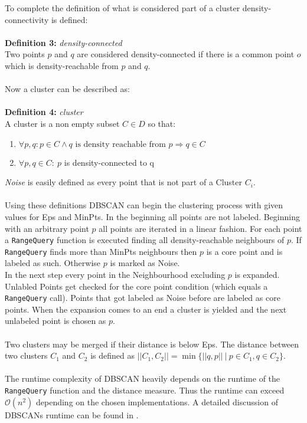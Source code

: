 To complete the definition of what is considered part of a cluster density-connectivity is defined:\\
\ \\
\textbf{Definition 3:} \textit{density-connected}\\
Two points $p$ and $q$ are considered density-connected if there is a common point $o$ which is density-reachable from $p$ and $q$.\\
\ \\
Now a cluster can be described as:\\
\ \\
\textbf{Definition 4:} \textit{cluster}\\
A cluster is a non empty subset $C \in D$ so that:
\begin{enumerate}
    \item $\forall p, q: p \in C \wedge q \text{ is density reachable from } p \Rightarrow q \in C$
    \item $\forall p, q \in C: \ p$ is density-connected to q
\end{enumerate}
\textit{Noise} is easily defined as every point that is not part of a Cluster $C_i$.\\
\ \\
Using these definitions DBSCAN can begin the clustering process with given values for Eps and MinPts. In the beginning all points are not labeled. Beginning with an arbitrary point $p$ all points are iterated in a linear fashion. For each point a \texttt{RangeQuery} function is executed finding all density-reachable neighbours of $p$. If \texttt{RangeQuery} finds more than MinPts neighbours then $p$ is a core point and is labeled as such. Otherwise $p$ is marked as Noise.\\
In the next step every point in the Neighbourhood excluding $p$ is expanded. Unlabled Points get checked for the core point condition (which equals a \texttt{RangeQuery} call). Points that got labeled as Noise before are labeled as core points.
When the expansion comes to an end a cluster is yielded and the next unlabeled point is chosen as $p$.\\
\\
Two clusters may be merged if their distance is below Eps. The distance between two clusters $C_1$ and $C_2$ is defined as $||C_1, C_2|| = \min \{ ||q, p|| \ | \ p \in C_1, q \in C_2\}$.\\
\ \\
The runtime complexity of DBSCAN heavily depends on the runtime of the \texttt{RangeQuery} function and the distance measure. Thus the runtime can exceed $\mathcal{O}(n^2)$ depending on the chosen implementations. A detailed discussion of DBSCANs runtime can be found in \cite{dbscanrevisited}. 